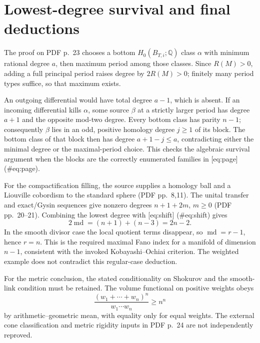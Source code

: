 \documentclass[10pt]{article}
\begin{document}
\section*{Lowest-degree survival and final deductions}
The proof on PDF p. 23 chooses a bottom \(H_0(B_{T,i};\mathbb Q)\) class \(\alpha\) with minimum rational degree \(a\), then maximum period among those classes. Since \(R(M)>0\), adding a full principal period raises degree by \(2R(M)>0\); finitely many period types suffice, so that maximum exists.\par
An outgoing differential would have total degree \(a-1\), which is absent. If an incoming differential kills \(\alpha\), some source \(\beta\) at a strictly larger period has degree \(a+1\) and the opposite mod-two degree. Every bottom class has parity \(n-1\); consequently \(\beta\) lies in an odd, positive homology degree \(j\geq1\) of its block. The bottom class of that block then has degree \(a+1-j\leq a\), contradicting either the minimal degree or the maximal-period choice. This checks the algebraic survival argument when the blocks are the correctly enumerated families in [eq:page] (\#eq:page).\par
For the compactification filling, the source supplies a homology ball and a Liouville cobordism to the standard sphere (PDF pp. 8,11). The unital transfer and exact/Gysin sequences give nonzero degrees \(n+1+2m\), \(m\geq0\) (PDF pp. 20–21). Combining the lowest degree with [eq:shift] (\#eq:shift) gives \[2\operatorname{md}=(n+1)+(n-3)=2n-2.\] In the smooth divisor case the local quotient terms disappear, so \(\operatorname{md}=r-1\), hence \(r=n\). This is the required maximal Fano index for a manifold of dimension \(n-1\), consistent with the invoked Kobayashi–Ochiai criterion. The weighted example does not contradict this regular-case deduction.\par
For the metric conclusion, the stated conditionality on Shokurov and the smooth-link condition must be retained. The volume functional on positive weights obeys \[\frac{(w_1+\cdots+w_n)^n}{w_1\cdots w_n}\geq n^n\] by arithmetic–geometric mean, with equality only for equal weights. The external cone classification and metric rigidity inputs in PDF p. 24 are not independently reproved.\par
\end{document}
